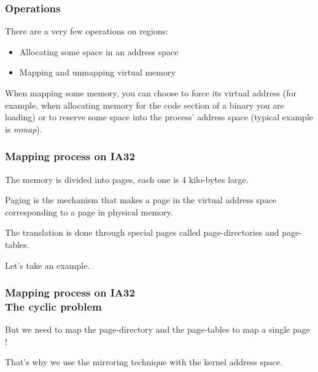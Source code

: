 
\begin{frame}
  \frametitle{Operations}

  There are a very few operations on regions:

  \begin{itemize}
  \item Allocating some space in an address space
  \item Mapping and unmapping virtual memory
  \end{itemize}

  \-

  When  mapping some  memory,  you  can choose  to  force its  virtual
  address (for example, when allocating memory for the code section of
  a binary you are loading) or to reserve some space into the process'
  address space (typical example is \emph{mmap}).

\end{frame}


\begin{frame}
  \frametitle{Mapping process on IA32}

  The memory is divided into pages, each one is 4 kilo-bytes large.

  \-

  Paging  is the mechanism  that makes  a page  in the  virtual address
  space corresponding to a page in physical memory.

  \-

  The   translation    is   done   through    special   pages   called
  page-directories and page-tables.

  \-

  Let's take an example.

\end{frame}


\begin{frame}
  \frametitle{Mapping process on IA32\\The cyclic problem}

  But we need  to map the page-directory and the  page-tables to map a
  single page !

  \-

  That's why we use the mirroring technique with the kernel address space.

\end{frame}

%
%

